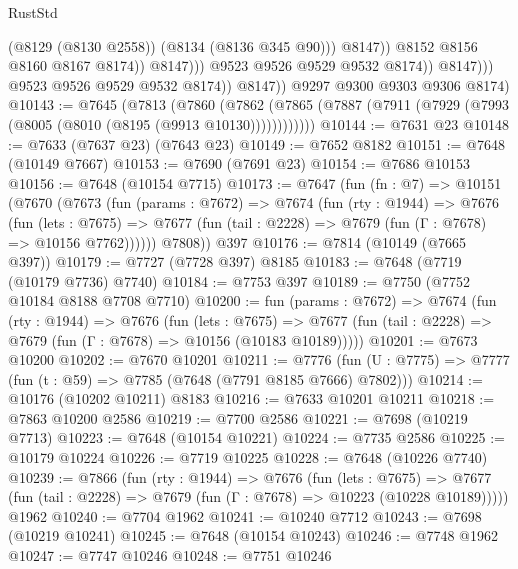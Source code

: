 \begin{lexlean}{RustStd}
\begin{coremodule}
                                        (@8129 (@8130 @2558))
                                        (@8134 (@8136 @345 @90)))
                                      @8147))
                                  @8152
                                  @8156
                                  @8160
                                  @8167
                                  @8174))
                              @8147)))
                        @9523
                        @9526
                        @9529
                        @9532
                        @8174))
                    @8147)))
              @9523
              @9526
              @9529
              @9532
              @8174))
          @8147))
      @9297
      @9300
      @9303
      @9306
      @8174)
@10143 := @7645
    (@7813
      (@7860
        (@7862 (@7865 (@7887 (@7911 (@7929 (@7993 (@8005 (@8010 (@8195 (@9913 @10130))))))))))))
@10144 := @7631 @23
@10148 := @7633 (@7637 @23) (@7643 @23)
@10149 := @7652 @8182
@10151 := @7648 (@10149 @7667)
@10153 := @7690 (@7691 @23)
@10154 := @7686 @10153
@10156 := @7648 (@10154 @7715)
@10173 := @7647
    (fun (fn : @7) =>
    @10151
      (@7670
        (@7673
          (fun (params : @7672) =>
          @7674
            (fun (rty : @1944) =>
            @7676
              (fun (lets : @7675) =>
              @7677 (fun (tail : @2228) => @7679 (fun (Γ : @7678) => @10156 @7762))))))
        @7808))
    @397
@10176 := @7814 (@10149 (@7665 @397))
@10179 := @7727 (@7728 @397) @8185
@10183 := @7648 (@7719 (@10179 @7736) @7740)
@10184 := @7753 @397
@10189 := @7750 (@7752 @10184 @8188 @7708 @7710)
@10200 := fun (params : @7672) =>
  @7674
    (fun (rty : @1944) =>
    @7676
      (fun (lets : @7675) =>
      @7677 (fun (tail : @2228) => @7679 (fun (Γ : @7678) => @10156 (@10183 @10189)))))
@10201 := @7673 @10200
@10202 := @7670 @10201
@10211 := @7776
    (fun (U : @7775) => @7777 (fun (t : @59) => @7785 (@7648 (@7791 @8185 @7666) @7802)))
@10214 := @10176 (@10202 @10211) @8183
@10216 := @7633 @10201 @10211
@10218 := @7863 @10200 @2586
@10219 := @7700 @2586
@10221 := @7698 (@10219 @7713)
@10223 := @7648 (@10154 @10221)
@10224 := @7735 @2586
@10225 := @10179 @10224
@10226 := @7719 @10225
@10228 := @7648 (@10226 @7740)
@10239 := @7866
    (fun (rty : @1944) =>
    @7676
      (fun (lets : @7675) =>
      @7677 (fun (tail : @2228) => @7679 (fun (Γ : @7678) => @10223 (@10228 @10189)))))
    @1962
@10240 := @7704 @1962
@10241 := @10240 @7712
@10243 := @7698 (@10219 @10241)
@10245 := @7648 (@10154 @10243)
@10246 := @7748 @1962
@10247 := @7747 @10246
@10248 := @7751 @10246

\end{coremodule}
\end{lexlean}
